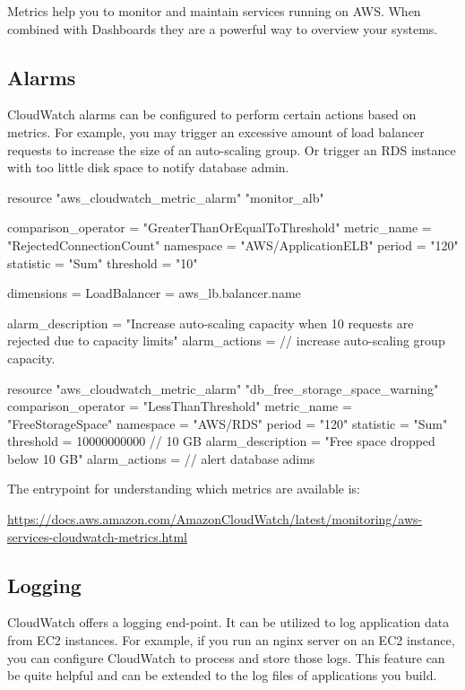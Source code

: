 \documentclass{csse4400}
\begin{document}
Metrics help you to monitor and maintain services running on AWS.
When combined with Dashboards they are a powerful way to overview your systems.

\subsection{Alarms}
CloudWatch alarms can be configured to perform certain actions based on metrics.
For example, you may trigger an excessive amount of load balancer requests to increase the size of an auto-scaling group.
Or trigger an RDS instance with too little disk space to notify database admin.

\begin{code}[language=terraform]{}
resource "aws_cloudwatch_metric_alarm" "monitor_alb" {
  comparison_operator = "GreaterThanOrEqualToThreshold"
  metric_name         = "RejectedConnectionCount"
  namespace           = "AWS/ApplicationELB"
  period              = "120"
  statistic           = "Sum"
  threshold           = "10"

  dimensions = {
    LoadBalancer = aws_lb.balancer.name
  }

  alarm_description = "Increase auto-scaling capacity when 10 requests are rejected due to capacity limits"
  alarm_actions     = // increase auto-scaling group capacity.
}

resource "aws_cloudwatch_metric_alarm" "db_free_storage_space_warning" {
  comparison_operator = "LessThanThreshold"
  metric_name         = "FreeStorageSpace"
  namespace           = "AWS/RDS"
  period              = "120"
  statistic           = "Sum"
  threshold           = 10000000000 // 10 GB
  alarm_description   = "Free space dropped below 10 GB"
  alarm_actions       = // alert database adims
}
\end{code}

\noindent The entrypoint for understanding which metrics are available is:

\noindent \url{https://docs.aws.amazon.com/AmazonCloudWatch/latest/monitoring/aws-services-cloudwatch-metrics.html}

\subsection{Logging}
CloudWatch offers a logging end-point.
It can be utilized to log application data from EC2 instances.
For example, if you run an nginx server on an EC2 instance,
you can configure CloudWatch to process and store those logs.
This feature can be quite helpful and can be extended to the log files of applications you build.
\end{document}
